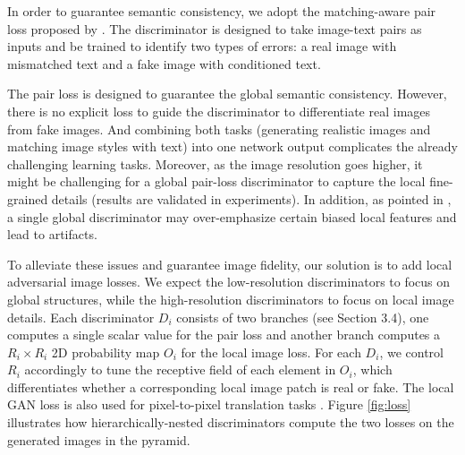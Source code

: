 \documentclass[10pt,twocolumn,letterpaper]{article}
\begin{document}
In order to guarantee semantic consistency, we adopt the matching-aware pair loss proposed by \cite{reed2016generative}. The discriminator is designed to take image-text pairs as inputs and be trained to identify two types of errors: a real image with mismatched text and a fake image with conditioned text.

The pair loss is designed to guarantee the global semantic consistency. However, there is no explicit loss to guide the discriminator to differentiate real images from fake images. And combining both tasks (generating realistic images and matching image styles with text) into one network output complicates the already challenging learning tasks. Moreover, as the image resolution goes higher, it might be challenging for a global pair-loss discriminator to capture the local fine-grained details (results are validated in experiments).
In addition, as pointed in \cite{shrivastava2016learning}, a single global discriminator may over-emphasize certain biased local features and lead to artifacts. 

To alleviate these issues and guarantee image fidelity, our solution is to add local adversarial image losses.
We expect the low-resolution discriminators to focus on global structures, while the high-resolution discriminators to focus on local image details.
Each discriminator $D_i$ consists of two branches (see Section 3.4), one computes a single scalar value for the pair loss and another branch computes a $R_i{\times}R_i$ 2D probability map $O_i$ for the local image loss.
For each $D_i$, we control $R_i$ accordingly to tune the receptive field of each element in $O_i$, which 
differentiates whether a corresponding local image patch is real or fake.
The local GAN loss is also used for pixel-to-pixel translation tasks \cite{shrivastava2016learning,zhu2017unpaired,isola2016image}. 
Figure \ref{fig:loss} illustrates how hierarchically-nested discriminators compute the two losses on the generated images in the pyramid. 
\end{document}
